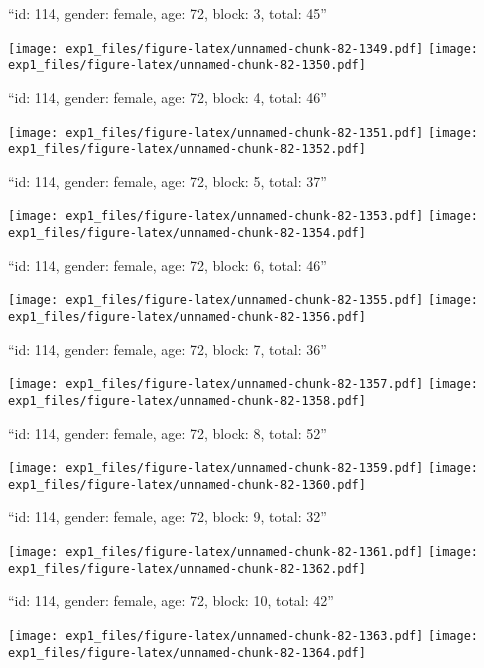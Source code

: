 \documentclass[11pt,,]{article}
\begin{document}
\newpage
[1] 

``id: 114, gender: female, age: 72, block: 3, total: 45''

\texttt{[image: exp1\_files/figure-latex/unnamed-chunk-82-1349.pdf]}
\texttt{[image: exp1\_files/figure-latex/unnamed-chunk-82-1350.pdf]}

\newpage
[1] 

``id: 114, gender: female, age: 72, block: 4, total: 46''

\texttt{[image: exp1\_files/figure-latex/unnamed-chunk-82-1351.pdf]}
\texttt{[image: exp1\_files/figure-latex/unnamed-chunk-82-1352.pdf]}

\newpage
[1] 

``id: 114, gender: female, age: 72, block: 5, total: 37''

\texttt{[image: exp1\_files/figure-latex/unnamed-chunk-82-1353.pdf]}
\texttt{[image: exp1\_files/figure-latex/unnamed-chunk-82-1354.pdf]}

\newpage
[1] 

``id: 114, gender: female, age: 72, block: 6, total: 46''

\texttt{[image: exp1\_files/figure-latex/unnamed-chunk-82-1355.pdf]}
\texttt{[image: exp1\_files/figure-latex/unnamed-chunk-82-1356.pdf]}

\newpage
[1] 

``id: 114, gender: female, age: 72, block: 7, total: 36''

\texttt{[image: exp1\_files/figure-latex/unnamed-chunk-82-1357.pdf]}
\texttt{[image: exp1\_files/figure-latex/unnamed-chunk-82-1358.pdf]}

\newpage
[1] 

``id: 114, gender: female, age: 72, block: 8, total: 52''

\texttt{[image: exp1\_files/figure-latex/unnamed-chunk-82-1359.pdf]}
\texttt{[image: exp1\_files/figure-latex/unnamed-chunk-82-1360.pdf]}

\newpage
[1] 

``id: 114, gender: female, age: 72, block: 9, total: 32''

\texttt{[image: exp1\_files/figure-latex/unnamed-chunk-82-1361.pdf]}
\texttt{[image: exp1\_files/figure-latex/unnamed-chunk-82-1362.pdf]}

\newpage
[1] 

``id: 114, gender: female, age: 72, block: 10, total: 42''

\texttt{[image: exp1\_files/figure-latex/unnamed-chunk-82-1363.pdf]}
\texttt{[image: exp1\_files/figure-latex/unnamed-chunk-82-1364.pdf]}
\end{document}
